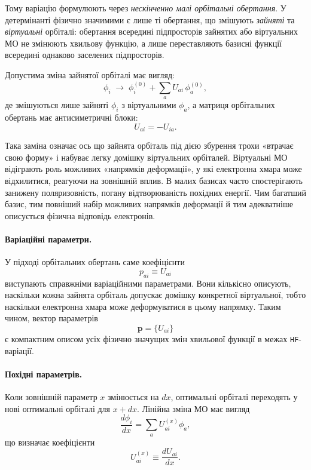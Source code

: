 Тому варіацію формулюють через \emph{нескінченно малі орбітальні обертання}. У детермінанті фізично значимими є лише ті обертання, що змішують \emph{зайняті} та \emph{віртуальні} орбіталі: обертання всередині підпросторів зайнятих або віртуальних МО не змінюють хвильову функцію, а лише переставляють базисні функції всередині однаково заселених підпросторів.


Допустима зміна зайнятої орбіталі має вигляд:
\begin{equation}\label{eq:small_rotation_intro}
	\phi_i \;\longrightarrow\;
	\phi_i^{(0)} + \sum_a U_{a i}\,\phi_a^{(0)},
\end{equation}
де змішуються лише зайняті $\phi_i$ з віртуальними $\phi_a$,
а матриця орбітальних обертань має антисиметричні блоки:
\[
	U_{ai} = -U_{ia}.
\]

Така заміна означає ось що зайнята орбіталь під дією збурення трохи «втрачає свою форму» і набуває легку домішку віртуальних орбіталей. Віртуальні МО відіграють роль можливих «напрямків деформації», у які електронна хмара може відхилитися, реагуючи на зовнішній вплив. В малих базисах часто спостерігають занижену поляризовність, погану відтворюваність похідних енергії. Чим багатший базис, тим повніший набір можливих напрямків деформації й тим адекватніше описується фізична відповідь електронів.

\paragraph{Варіаційні параметри.}

У підході орбітальних обертань саме коефіцієнти
\begin{equation}\label{eq:p_HF_definition}
	p_{ai} \equiv U_{ai}
\end{equation}
виступають справжніми варіаційними параметрами. Вони кількісно описують,
наскільки кожна зайнята орбіталь допускає домішку конкретної віртуальної,
тобто наскільки електронна хмара може деформуватися в цьому напрямку.
Таким чином, вектор параметрів
\[
	\mathbf p = \{U_{ai}\}
\]
є компактним описом усіх фізично значущих змін хвильової функції
в межах \texttt{HF}-варіації.


\paragraph{Похідні параметрів.}
Коли зовнішній параметр $x$ змінюється на $dx$, оптимальні орбіталі
переходять у нові оптимальні орбіталі для $x+dx$.
Лінійна зміна МО має вигляд
\begin{equation}\label{eq:HF_MO_derivative}
	\frac{d\phi_i}{dx}
	=
	\sum_a U_{ai}^{(x)} \phi_a ,
\end{equation}
що визначає коефіцієнти
\[
	U_{ai}^{(x)} \equiv \frac{dU_{ai}}{dx}.
\]

